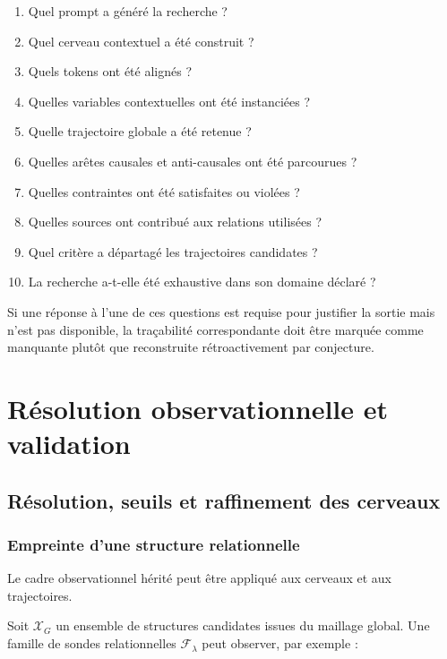 \documentclass[11pt,a4paper,oneside]{book}
\theoremstyle{remark}
\begin{document}
\begin{enumerate}
  \item Quel prompt a généré la recherche ?
  \item Quel cerveau contextuel a été construit ?
  \item Quels tokens ont été alignés ?
  \item Quelles variables contextuelles ont été instanciées ?
  \item Quelle trajectoire globale a été retenue ?
  \item Quelles arêtes causales et anti-causales ont été parcourues ?
  \item Quelles contraintes ont été satisfaites ou violées ?
  \item Quelles sources ont contribué aux relations utilisées ?
  \item Quel critère a départagé les trajectoires candidates ?
  \item La recherche a-t-elle été exhaustive dans son domaine déclaré ?
\end{enumerate}

Si une réponse à l'une de ces questions est requise pour justifier
la sortie mais n'est pas disponible, la traçabilité correspondante
doit être marquée comme manquante plutôt que reconstruite
rétroactivement par conjecture.


\part{Résolution observationnelle et validation}

\chapter{Résolution, seuils et raffinement des cerveaux}

\section{Empreinte d'une structure relationnelle}

Le cadre observationnel hérité peut être appliqué aux cerveaux et
aux trajectoires.

Soit \(\mathcal{X}_G\) un ensemble de structures candidates issues
du maillage global. Une famille de sondes relationnelles
\(\mathcal{F}_\lambda\) peut observer, par exemple :
\end{document}
